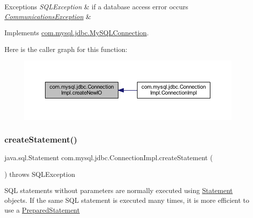 \begin{DoxyExceptions}{Exceptions}
{\em S\+Q\+L\+Exception} & if a database access error occurs \\
\hline
{\em \mbox{\hyperlink{classcom_1_1mysql_1_1jdbc_1_1_communications_exception}{Communications\+Exception}}} & \\
\hline
\end{DoxyExceptions}


Implements \mbox{\hyperlink{interfacecom_1_1mysql_1_1jdbc_1_1_my_s_q_l_connection}{com.\+mysql.\+jdbc.\+My\+S\+Q\+L\+Connection}}.

Here is the caller graph for this function\+:\nopagebreak
\begin{figure}[H]
\begin{center}
\leavevmode
\includegraphics[width=350pt]{classcom_1_1mysql_1_1jdbc_1_1_connection_impl_ade9022e02eb0afed7976e6bc0f0b86da_icgraph}
\end{center}
\end{figure}
\mbox{\label{classcom_1_1mysql_1_1jdbc_1_1_connection_impl_af371aac6b857e26e7f92d486c52e3994}} 
\subsubsection{\texorpdfstring{create\+Statement()}{createStatement()}\hspace{0.1cm}{\footnotesize\ttfamily [1/3]}}
{\footnotesize\ttfamily java.\+sql.\+Statement com.\+mysql.\+jdbc.\+Connection\+Impl.\+create\+Statement (\begin{DoxyParamCaption}{ }\end{DoxyParamCaption}) throws S\+Q\+L\+Exception}

S\+QL statements without parameters are normally executed using \mbox{\hyperlink{interfacecom_1_1mysql_1_1jdbc_1_1_statement}{Statement}} objects. If the same S\+QL statement is executed many times, it is more efficient to use a \mbox{\hyperlink{classcom_1_1mysql_1_1jdbc_1_1_prepared_statement}{Prepared\+Statement}}

